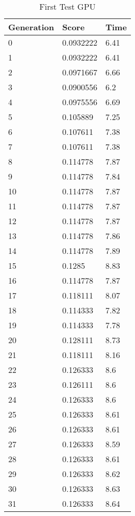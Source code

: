 \begin{table}
\caption{First Test GPU}
\centering
 \begin{tabular}{ | l | l | l |}
    \hline
    Generation & Score & Time \\ \hline
    0 & 0.0932222 & 6.41 \\ \hline
    1 & 0.0932222 & 6.41 \\ \hline
    2 & 0.0971667 & 6.66 \\ \hline
    3 & 0.0900556 & 6.2 \\ \hline
    4 & 0.0975556 & 6.69 \\ \hline
    5 & 0.105889 & 7.25 \\ \hline
    6 & 0.107611 & 7.38 \\ \hline
    7 & 0.107611 & 7.38 \\ \hline
    8 & 0.114778 & 7.87 \\ \hline
    9 & 0.114778 & 7.84 \\ \hline
    10 & 0.114778 & 7.87 \\ \hline
    11 & 0.114778 & 7.87 \\ \hline
    12 & 0.114778 & 7.87 \\ \hline
    13 & 0.114778 & 7.86 \\ \hline
    14 & 0.114778 & 7.89 \\ \hline
    15 & 0.1285 & 8.83 \\ \hline
    16 & 0.114778 & 7.87 \\ \hline
    17 & 0.118111 & 8.07 \\ \hline
    18 & 0.114333 & 7.82 \\ \hline
    19 & 0.114333 & 7.78 \\ \hline
    20 & 0.128111 & 8.73 \\ \hline
    21 & 0.118111 & 8.16 \\ \hline
    22 & 0.126333 & 8.6 \\ \hline
    23 & 0.126111 & 8.6 \\ \hline
    24 & 0.126333 & 8.6 \\ \hline
    25 & 0.126333 & 8.61 \\ \hline
    26 & 0.126333 & 8.61 \\ \hline
    27 & 0.126333 & 8.59 \\ \hline
    28 & 0.126333 & 8.61 \\ \hline
    29 & 0.126333 & 8.62 \\ \hline
    30 & 0.126333 & 8.63 \\ \hline
    31 & 0.126333 & 8.64 \\ \hline

\end{tabular}
\end{table}
